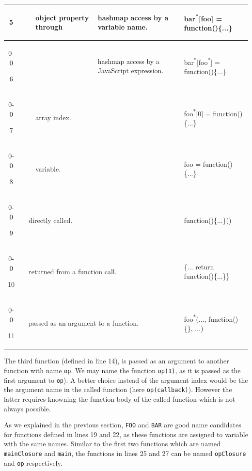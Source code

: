 \documentclass[10pt, preprint]{sigplanconf}
\begin{document}
\begin{table}
{\begin{tabular}{ | c | l | l | l | m{2.5cm} | l|}
   5 &
   & 
   & \multirow{4}{*}{\hspace{.2cm}\begin{rotate}{90}object property through\end{rotate}}
   & \raggedright hashmap access by a variable name.
   & bar\textsuperscript{*}[foo] = function()\{...\} \\
   \cline{0-0}\cline{5-6} 

   6 &
   & 
   & 
   & \raggedright hashmap access by a JavaScript expression.
   & bar\textsuperscript{*}[foo\textsuperscript{*}] = function()\{...\} \\
   \cline{0-0}\cline{4-6} 

   7 &
   &
   & \multicolumn{2}{|l|}{
      array index.}
   & foo\textsuperscript{*}[0] = function()\{...\} \\
   \cline{0-0}\cline{4-6} 

   8 &
   & 
   & \multicolumn{2}{|l|}{
      variable.}
   & foo = function()\{...\} \\
   \cline{0-0}\cline{3-6} 
   
   9 &
   & \multicolumn{3}{|m{3.8cm}|}{
     \raggedright directly called.}
   & function()\{...\}() \\
   \cline{0-0}\cline{3-6} 

   10 &
   & \multicolumn{3}{|m{3.5cm}|}{
     \raggedright returned from a function call.}
   & \{... return function()\{...\}\} \\
   \cline{0-0}\cline{3-6} 

   11 &
   & \multicolumn{3}{|m{3.5cm}|}{
     \raggedright passed as an argument to a function.}
   & foo\textsuperscript{*}(..., function()\{\}, ...) \\
   \hline 

  \end{tabular}
  }
 \label{function-types} 
\end{table}

 The third function (defined in line 14), is passed as an argument to another function with name {\small\texttt{op}}. We may name the function {\small\texttt{op(1)}}, as it is passed as the first argument to {\small\texttt{op}}). A better choice instead of the argument index would be the the argument name in the called function (here {\small\texttt{op(callback)}}). However the latter requires knowning the function body of the called function which is not always possible.
    
    As we explained in the previous section, {\small\texttt{FOO}} and {\small\texttt{BAR}} are good name candidates for functions defined in lines 19 and 22, as these functions are assigned to variable with the same names. Similar to the first two functions which are named {\small\texttt{mainClosure}} and {\small\texttt{main}}, the functions in lines 25 and 27 can be named {\small\texttt{opClosure}} and {\small\texttt{op}} respectively.
 
\end{document}
